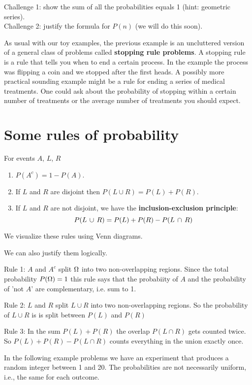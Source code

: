 Challenge 1: show the sum of all the probabilities equals 1 (hint: geometric series).\\
Challenge 2: justify the formula for $P(n)$ (we will do this soon).

As usual with our
toy examples, the previous example is an uncluttered version of a general
class of problems called \textbf{stopping rule problems}. A
stopping rule is a rule that tells you when to end a certain
process.  In the example the process was flipping a coin and 
we stopped after the first heads.  A
possibly more practical sounding example might be a rule for
ending a series of medical treatments.  One could ask about
the probability of stopping within a certain number of
treatments or the average number of treatments you should
expect.


\section{Some rules of probability}
For events $A$, $L$, $R$
\begin{enumerate}[Rule 1.]
\item $P(A^c)  = 1 - P(A)$.
\item If $L$ and $R$ are disjoint then $P(L \cup R)  = P(L) + P(R)$.
\item If $L$ and $R$ are not disjoint, we have the \textbf{inclusion-exclusion principle}: $$P(L\,\cup\, R)  =  P(L) + P(R) - P(L\,\cap\, R)$$
\end{enumerate}

We visualize these rules using Venn diagrams.


We can also justify them logically.

Rule 1: 
$A$ and $A^c$ split $\Omega$ into
two non-overlapping regions. Since the total probability  $P(\Omega) = 1$ 
this rule says that the probabiity of $A$ and the probability of 'not $A$'
are complementary, i.e. sum to 1.

Rule 2: 
$L$ and $R$ split $L\cup R$ into
two non-overlapping regions. So the probability of $L\cup R$ is
is split between $P(L)$ and $P(R)$

Rule 3: 
In the sum $P(L) + P(R)$ the overlap $P(L\cap R)$ gets counted twice.
So $P(L) + P(R) - P(L\cap R)$ counts everything in the union exactly once.

In the following example problems we have an experiment that produces
a random integer between 1 and 20. The probabilities are not 
necessarily uniform, i.e., the same for each outcome.

